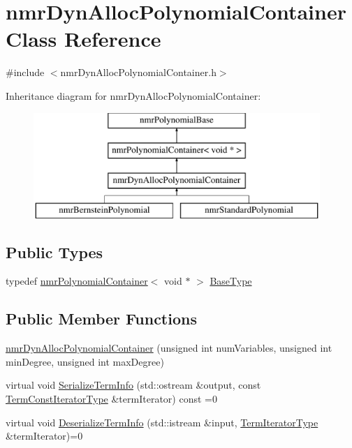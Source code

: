 \hypertarget{classnmr_dyn_alloc_polynomial_container}{}\section{nmr\+Dyn\+Alloc\+Polynomial\+Container Class Reference}
\label{classnmr_dyn_alloc_polynomial_container}


{\ttfamily \#include $<$nmr\+Dyn\+Alloc\+Polynomial\+Container.\+h$>$}

Inheritance diagram for nmr\+Dyn\+Alloc\+Polynomial\+Container\+:\begin{figure}[H]
\begin{center}
\leavevmode
\includegraphics[height=4.000000cm]{dc/d85/classnmr_dyn_alloc_polynomial_container}
\end{center}
\end{figure}
\subsection*{Public Types}
\begin{DoxyCompactItemize}
\item 
typedef \hyperlink{classnmr_polynomial_container}{nmr\+Polynomial\+Container}$<$ void $\ast$ $>$ \hyperlink{classnmr_dyn_alloc_polynomial_container_a237c3e90961020b060ad1118206f4079}{Base\+Type}
\end{DoxyCompactItemize}
\subsection*{Public Member Functions}
\begin{DoxyCompactItemize}
\item 
\hyperlink{classnmr_dyn_alloc_polynomial_container_a31ea4b22ad8d90980ec372d8ba666b41}{nmr\+Dyn\+Alloc\+Polynomial\+Container} (unsigned int num\+Variables, unsigned int min\+Degree, unsigned int max\+Degree)
\item 
virtual void \hyperlink{classnmr_dyn_alloc_polynomial_container_a523aa33f3b5729a4cd9500fa278e56c6}{Serialize\+Term\+Info} (std\+::ostream \&output, const \hyperlink{classnmr_polynomial_container_aba8d31506ab6a487fdc4fe2815469442}{Term\+Const\+Iterator\+Type} \&term\+Iterator) const =0
\item 
virtual void \hyperlink{classnmr_dyn_alloc_polynomial_container_a166383324b0c1392e5faf798d7c5a622}{Deserialize\+Term\+Info} (std\+::istream \&input, \hyperlink{classnmr_polynomial_container_a276e57445d038e8a16462f47b85719a3}{Term\+Iterator\+Type} \&term\+Iterator)=0
\end{DoxyCompactItemize}
